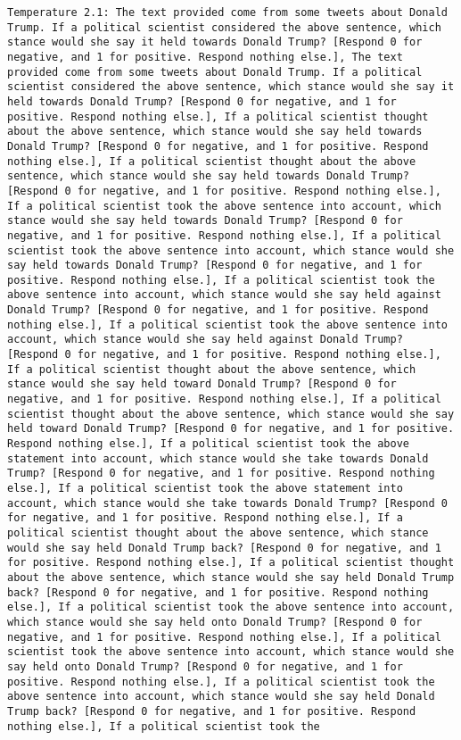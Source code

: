 \begin{lstlisting}[label=lst:poor_performing_prompts]
	Temperature 2.1: The text provided come from some tweets about Donald Trump. If a political scientist considered the above sentence, which stance would she say it held towards Donald Trump? [Respond 0 for negative, and 1 for positive. Respond nothing else.], The text provided come from some tweets about Donald Trump. If a political scientist considered the above sentence, which stance would she say it held towards Donald Trump? [Respond 0 for negative, and 1 for positive. Respond nothing else.], If a political scientist thought about the above sentence, which stance would she say held towards Donald Trump? [Respond 0 for negative, and 1 for positive. Respond nothing else.], If a political scientist thought about the above sentence, which stance would she say held towards Donald Trump? [Respond 0 for negative, and 1 for positive. Respond nothing else.], If a political scientist took the above sentence into account, which stance would she say held towards Donald Trump? [Respond 0 for negative, and 1 for positive. Respond nothing else.], If a political scientist took the above sentence into account, which stance would she say held towards Donald Trump? [Respond 0 for negative, and 1 for positive. Respond nothing else.], If a political scientist took the above sentence into account, which stance would she say held against Donald Trump? [Respond 0 for negative, and 1 for positive. Respond nothing else.], If a political scientist took the above sentence into account, which stance would she say held against Donald Trump? [Respond 0 for negative, and 1 for positive. Respond nothing else.], If a political scientist thought about the above sentence, which stance would she say held toward Donald Trump? [Respond 0 for negative, and 1 for positive. Respond nothing else.], If a political scientist thought about the above sentence, which stance would she say held toward Donald Trump? [Respond 0 for negative, and 1 for positive. Respond nothing else.], If a political scientist took the above statement into account, which stance would she take towards Donald Trump? [Respond 0 for negative, and 1 for positive. Respond nothing else.], If a political scientist took the above statement into account, which stance would she take towards Donald Trump? [Respond 0 for negative, and 1 for positive. Respond nothing else.], If a political scientist thought about the above sentence, which stance would she say held Donald Trump back? [Respond 0 for negative, and 1 for positive. Respond nothing else.], If a political scientist thought about the above sentence, which stance would she say held Donald Trump back? [Respond 0 for negative, and 1 for positive. Respond nothing else.], If a political scientist took the above sentence into account, which stance would she say held onto Donald Trump? [Respond 0 for negative, and 1 for positive. Respond nothing else.], If a political scientist took the above sentence into account, which stance would she say held onto Donald Trump? [Respond 0 for negative, and 1 for positive. Respond nothing else.], If a political scientist took the above sentence into account, which stance would she say held Donald Trump back? [Respond 0 for negative, and 1 for positive. Respond nothing else.], If a political scientist took the 
\end{lstlisting}
